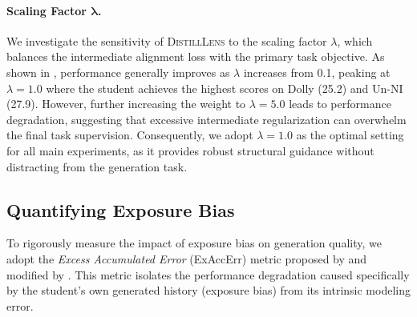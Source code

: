 \documentclass{article}
\theoremstyle{plain}
\theoremstyle{definition}
\theoremstyle{remark}
\begin{document}
\paragraph{Scaling Factor $\mathbf{\lambda}$.}
\begin{table}[t]
    \centering
    \caption{\textbf{R-L Score.} \textsc{DistillLens} performs best in average with scaling factor $\lambda=1.0$.}
    \label{tab:lambda_ablate}
\end{table}
We investigate the sensitivity of \textsc{DistillLens} to the scaling factor $\lambda$, which balances the intermediate alignment loss with the primary task objective. 
As shown in , performance generally improves as $\lambda$ increases from 0.1, peaking at $\lambda=1.0$ where the student achieves the highest scores on Dolly (25.2) and Un-NI (27.9). 
However, further increasing the weight to $\lambda=5.0$ leads to performance degradation, suggesting that excessive intermediate regularization can overwhelm the final task supervision. 
Consequently, we adopt $\lambda=1.0$ as the optimal setting for all main experiments, as it provides robust structural guidance without distracting from the generation task.



\subsection{Quantifying Exposure Bias}
\label{app:sec:exposure_bias}

To rigorously measure the impact of exposure bias on generation quality, we adopt the \textit{Excess Accumulated Error} (ExAccErr) metric proposed by \citet{arora2022exposure} and modified by \citet{gu2024minillm}. This metric isolates the performance degradation caused specifically by the student's own generated history (exposure bias) from its intrinsic modeling error.
\end{document}
